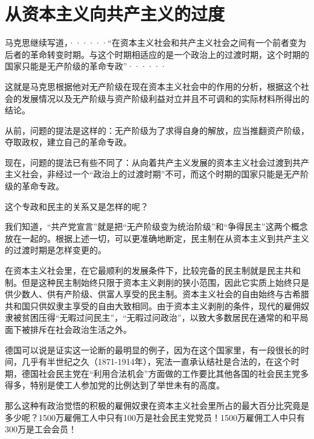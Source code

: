 \chapter{从资本主义向共产主义的过度} %

\pskip
\leftskip=10mm
\small

马克思继续写道，······“在资本主义社会和共产主义社会之间有一个前者变为后者的革命转变时期。与这个时期相适应的是一个政治上的过渡时期，这个时期的国家只能是{\kaishu 无产阶级的革命专政}”······

\normalsize
\leftskip=0mm
\pskip

这就是马克思根据他对无产阶级在现在资本主义社会中的作用的分析，根据这个社会的发展情况以及无产阶级与资产阶级利益对立并且不可调和的实际材料所得出的结论。

从前，问题的提法是这样的：无产阶级为了求得自身的解放，应当推翻资产阶级，夺取政权，建立自己的革命专政。

现在，问题的提法已有些不同了：从向着共产主义发展的资本主义社会过渡到共产主义社会，非经过一个“政治上的过渡时期”不可，而这个时期的国家只能是无产阶级的革命专政。

这个专政和民主的关系又是怎样的呢？

我们知道，“共产党宣言”就是把“无产阶级变为统治阶级”和“争得民主”这两个概念放在一起的。根据上述一切，可以更准确地断定，民主制在从资本主义到共产主义的过渡时期是怎样变更的。

在资本主义社会里，在它最顺利的发展条件下，比较完备的民主制就是民主共和制。但是这种民主制始终只限于资本主义剥削的狭小范围，因此它实质上始终只是供少数人、供有产阶级、供富人享受的民主制。资本主义社会的自由始终与古希腊共和国只供奴隶主享受的自由大致相同。由于资本主义剥削的条件，现代的雇佣奴隶被贫困压得“无暇过问民主”，“无暇过问政治”，以致大多数居民在通常的和平局面下被排斥在社会政治生活之外。

德国可以说是证实这一论断的最明显的例子，因为在这个国家里，有一段很长的时间，几乎有半世纪之久（1871-1914年），宪法一直承认结社是合法的，在这个时期，德国社会民主党在“利用合法机会”方面做的工作要比其他各国的社会民主党多得多，特别是使工人参加党的比例达到了举世未有的高度。

那么这种有政治觉悟的积极的雇佣奴隶在资本主义社会里所占的最大百分比究竟是多少呢？1500万雇佣工人中只有100万是社会民主党党员！1500万雇佣工人中只有300万是工会会员！

